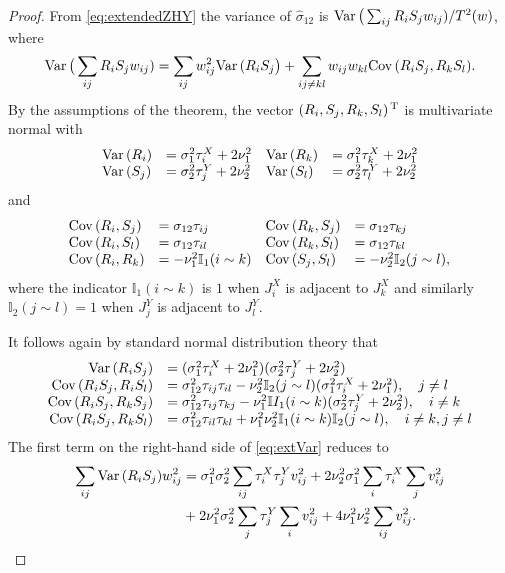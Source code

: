 \begin{proof}
From \eqref{eq:extendedZHY} the variance of $\hat{\sigma}_{12}$ is $\text{\rm Var}\, \big(\sum_{ij} R_i S_j w_{ij})/T^2(w)$, where 
\begin{equation}\label{eq:extVar} \text{\rm Var}\, \big(\sum_{ij} R_i S_j w_{ij}) = \sum_{ij} w_{ij}^2 \text{\rm Var}\,(R_i S_j\big) + \sum_{ij \neq kl}w_{ij} w_{kl} \text{\rm Cov}\,(R_i S_j,R_k S_l).\end{equation}
By the assumptions of the theorem, the vector $(R_i,S_j,R_k,S_l)^{\,\text{T}}$ is multivariate normal with
$$ \begin{array}{llll}
\text{\rm Var}\,(R_i) &= \sigma_1^2 \tau_i^X + 2 \nu_1^2 & \text{\rm Var}\,(R_k) &= \sigma_1^2 \tau_k^X + 2 \nu_1^2 \\
\text{\rm Var}\,(S_j) &= \sigma_2^2 \tau_j^Y + 2 \nu_2^2 & \text{\rm Var}\,(S_l) &= \sigma_2^2 \tau_l^Y + 2 \nu_2^2
\end{array}
$$
and  
$$ \begin{array}{llll}
\text{\rm Cov}\,(R_i, S_j) &= \sigma_{12} \tau_{ij} & \text{\rm Cov}\,(R_k, S_j) &= \sigma_{12} \tau_{kj} \\
\text{\rm Cov}\,(R_i, S_l) &= \sigma_{12} \tau_{il} & \text{\rm Cov}\,(R_k, S_l) &= \sigma_{12} \tau_{kl} \\
\text{\rm Cov}\,(R_i, R_k) &= - \nu_1^2 \mathbb{I}_1(i \sim k) & \text{\rm Cov}\,(S_j, S_l) &= - \nu_2^2 \mathbb{I}_2(j \sim l),
\end{array}
$$
where the indicator $\mathbb{I}_1(i \sim k)$ is $1$ when $J^X_i$ is adjacent to $J^X_k$ and similarly $\mathbb{I}_2(j \sim l) = 1$ when $J^Y_j$ is adjacent to $J^Y_l$. 

It follows again by standard normal distribution theory that  
$$
\begin{array}{rl}
\text{\rm Var}\,(R_i S_j) &= (\sigma_1^2 \tau_i^X + 2 \nu_1^2)(\sigma_2^2 \tau_j^Y + 2 \nu_2^2)\\
\text{\rm Cov}\,(R_i S_j, R_i S_l) &= \sigma^2_{12}  \tau_{ij} \tau_{il} - \nu_2^2 \mathbb{I}_2(j \sim l) (\sigma_1^2 \tau_i^X  + 2 \nu_1^2), \quad j \neq l\\
\text{\rm Cov}\,(R_i S_j, R_k S_j) &= \sigma^2_{12}  \tau_{ij} \tau_{kj} - \nu_1^2 \mathbb{I}I_1(i \sim k) (\sigma_2^2 \tau_j^Y  + 2 \nu_2^2), \quad i \neq k \\
\text{\rm Cov}\,(R_i S_j, R_k S_l) &= \sigma^2_{12}  \tau_{il} \tau_{kl} + \nu_1^2 \nu_2^2 \mathbb{I}_1(i \sim k) \mathbb{I}_2(j\sim l), \quad i\neq k, j \neq l
\end{array}
$$
The first term on the right-hand side of \eqref{eq:extVar} reduces to 
\begin{align}\label{eq:varcase}
\sum_{ij} \text{\rm Var}\,(R_i S_j)w_{ij}^2 &= \sigma_1^2 \sigma_2^2 \sum_{ij} \tau_i^X \tau_j^Y v^2_{ij}
+2\nu_2^2 \sigma_1^2 \sum_i \tau_i^X \sum_j v^2_{ij} \notag \\
&+2\nu_1^2 \sigma_2^2 \sum_j \tau_j^Y \sum_i v^2_{ij}  
+4 \nu_1^2 \nu_2^2 \sum_{ij} v^2_{ij} .
\end{align} 


\end{proof}

